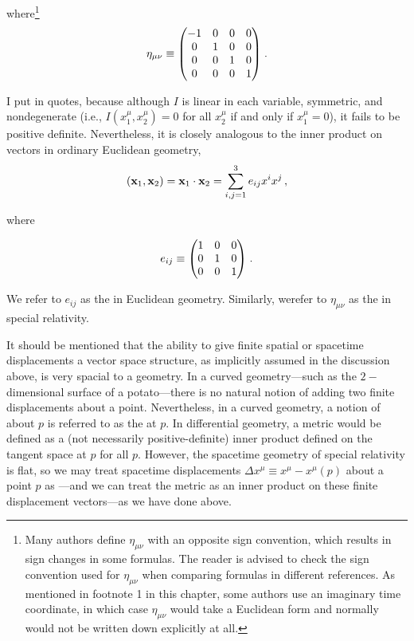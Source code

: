 where\footnote{Many authors define $\eta_{\mu \nu}$ with an opposite sign convention, which results in sign changes in some formulas. The reader is advised to check the sign convention used for $\eta_{\mu \nu}$ when comparing formulas in different references. As mentioned in footnote 1 in this chapter, some authors use an imaginary time coordinate, in which case $\eta_{\mu \nu}$ would take a Euclidean form and normally would not be written down explicitly at all.}
\begin{equation}\label{eq:8.7}
\eta_{\mu \nu} \equiv \mqty(-1 &0 &0 &0\\ 0 &1 &0 &0\\ 0 &0 &1 &0\\ 0 &0 &0 &1)\;.
\end{equation}

I put  in quotes, because although $I$ is linear in each variable, symmetric, and nondegenerate (i.e., $I(x^\mu_1, x^\mu_2) = 0$ for all $x^\mu_2$ if and only if $x^\mu_1 = 0$), it fails to be positive definite. Nevertheless, it is closely analogous to the inner product on vectors in ordinary Euclidean geometry, 
\begin{equation}\label{eq:8.8}
(\vb{x}_1, \vb{x}_2) = \vb{x}_1 \cdot \vb{x}_2 = \sum_{i,j=1}^3 e_{ij} x^i x^j\,,  
\end{equation}

where 

\begin{equation}\label{eq:8.9}
e_{i j} \equiv \mqty(1 &0 &0\\ 0 &1 &0\\ 0 &0 &1)\;.
\end{equation}

We refer to $e_{ij}$ as the  in Euclidean geometry. Similarly, werefer to $\eta_{\mu \nu}$ as the 
 in special relativity.

It should be mentioned that the ability to give finite spatial or spacetime displacements a vector space structure, as implicitly assumed in the discussion above, is very spacial to a  geometry. In a curved geometry---such as the $2-$dimensional surface of a potato---there is no natural notion of adding two finite displacements about a point. Nevertheless, in a curved geometry, a notion of 
 about $p$ is referred to as the  at $p$. 
In differential geometry, a metric would be defined as a (not necessarily positive-definite) inner product defined on the tangent space at $p$ for all $p$. However, the spacetime geometry of special relativity is flat, so we may treat  spacetime displacements 
$\Delta x^\mu \equiv x^\mu - x^\mu(p)$ about a point $p$ as ---and we can treat the metric as an inner product on these finite displacement vectors---as we have done above.

